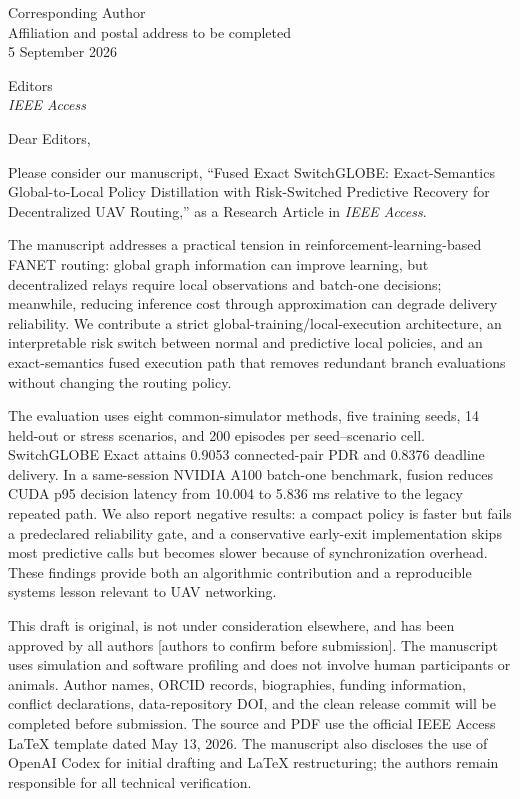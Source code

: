\documentclass{article}
\begin{document}
\begin{flushright}
Corresponding Author\\
Affiliation and postal address to be completed\\
5 September 2026
\end{flushright}

Editors\\
\emph{IEEE Access}

Dear Editors,

Please consider our manuscript, ``Fused Exact SwitchGLOBE: Exact-Semantics Global-to-Local Policy Distillation with Risk-Switched Predictive Recovery for Decentralized UAV Routing,'' as a Research Article in \emph{IEEE Access}.

The manuscript addresses a practical tension in reinforcement-learning-based FANET routing: global graph information can improve learning, but decentralized relays require local observations and batch-one decisions; meanwhile, reducing inference cost through approximation can degrade delivery reliability. We contribute a strict global-training/local-execution architecture, an interpretable risk switch between normal and predictive local policies, and an exact-semantics fused execution path that removes redundant branch evaluations without changing the routing policy.

The evaluation uses eight common-simulator methods, five training seeds, 14 held-out or stress scenarios, and 200 episodes per seed--scenario cell. SwitchGLOBE Exact attains 0.9053 connected-pair PDR and 0.8376 deadline delivery. In a same-session NVIDIA A100 batch-one benchmark, fusion reduces CUDA p95 decision latency from 10.004 to 5.836 ms relative to the legacy repeated path. We also report negative results: a compact policy is faster but fails a predeclared reliability gate, and a conservative early-exit implementation skips most predictive calls but becomes slower because of synchronization overhead. These findings provide both an algorithmic contribution and a reproducible systems lesson relevant to UAV networking.

This draft is original, is not under consideration elsewhere, and has been approved by all authors [authors to confirm before submission]. The manuscript uses simulation and software profiling and does not involve human participants or animals. Author names, ORCID records, biographies, funding information, conflict declarations, data-repository DOI, and the clean release commit will be completed before submission. The source and PDF use the official IEEE Access LaTeX template dated May 13, 2026. The manuscript also discloses the use of OpenAI Codex for initial drafting and LaTeX restructuring; the authors remain responsible for all technical verification.
\end{document}
